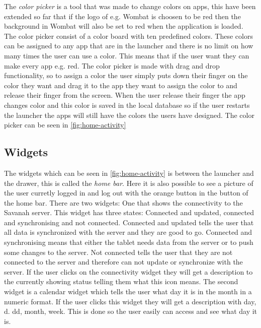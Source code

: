 The \textit{color picker} is a tool that was made to change colors on apps, this have been extended so far that if the logo of e.g. Wombat is choosen to be red then the background in Wombat will also be set to red when the application is loaded.
The color picker consist of a color board with ten predefined \giraf[] colors. These colors can be assigned to any app that are in the launcher and there is no limit on how many times the user can use a color. This means that if the user want they can make every app e.g. red.
The color picker is made with drag and drop functionality, so to assign a color the user simply puts down their finger on the color they want and drag it to the app they want to assign the color to and release their finger from the screen.
When the user release their finger the app changes color and this color is saved in the local database so if the user restarts the launcher the apps will still have the colors the users have designed. 
The color picker can be seen in \autoref{fig:home-activity}


\subsection{Widgets}

The widgets which can be seen in \autoref{fig:home-activity} is between the launcher and the drawer, this is called the \textit{home bar}. Here it is also possible to see a picture of the user curretly logged in and log out with the orange button in the button of the home bar. There are two widgets: One that shows the connectivity to the Savanah server. This widget has three states: Connected and updated, connected and synchronising and not connected. Connected and updated tells the user that all data is synchronized with the server and they are good to go. Connected and synchronising means that either the tablet needs data from the server or to push some changes to the server. Not connected tells the user that they are not connected to the server and therefore can not update or synchronize with the server. 
If the user clicks on the connectivity widget they will get a description to the currently showing status telling them what this icon means.
The second widget is a calendar widget which tells the user what day it is in the month in a numeric format. If the user clicks this widget they will get a description with day, d. dd, month, week. This is done so the user easily can access and see what day it is.


\begin{lstlisting}[style=sourceCode, language=JAVA, caption=This is code, label=lst:homeActivity] 

\end{lstlisting}